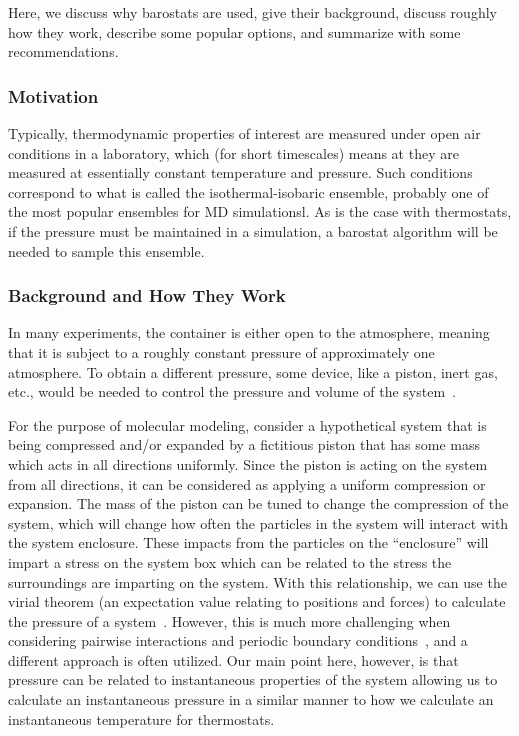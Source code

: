 \documentclass[9pt,bestpractices]{livecoms}
\begin{document}
Here, we discuss why barostats are used, give their background, discuss roughly how they work, describe some popular options, and summarize with some recommendations.

\subsubsection{Motivation}
Typically, thermodynamic properties of interest are measured under open air conditions in a laboratory, which (for short timescales) means at they are measured at essentially constant temperature and pressure.
Such conditions correspond to what is called the isothermal-isobaric ensemble, probably one of the most popular ensembles for MD simulationsl.
As is the case with thermostats, if the pressure must be maintained in a simulation, a barostat algorithm will be needed to sample this ensemble.

\subsubsection{Background and How They Work}
In many experiments, the container is either open to the atmosphere, meaning that it is subject to a roughly constant pressure of approximately one atmosphere. %
To obtain a different pressure, some device, like a piston, inert gas, etc\@., would be needed to control the pressure and volume of the system~\cite{tuckermanBook, ShellNotes}.

For the purpose of molecular modeling, consider a hypothetical system that is being compressed and/or expanded by a fictitious piston that has some mass which acts in all directions uniformly.
Since the piston is acting on the system from all directions, it can be considered as applying a uniform compression or expansion.
The mass of the piston can be tuned to change the compression of the system, which will change how often the particles in the system will interact with the system enclosure.
These impacts from the particles on the ``enclosure'' will impart a stress on the system box which can be related to the stress the surroundings are imparting on the system.
With this relationship, we can use the virial theorem (an expectation value relating to positions and forces) to calculate the pressure of a system~\cite{ShellNotes, LeachBook}.
However, this is much more challenging when considering pairwise interactions and periodic boundary conditions~\cite{allenTildesleyLiquids, tuckermanBook, ShellNotes}, and a different approach is often utilized.
Our main point here, however, is that pressure can be related to instantaneous properties of the system allowing us to calculate an instantaneous pressure in a similar manner to how we calculate an instantaneous temperature for thermostats.
\end{document}
